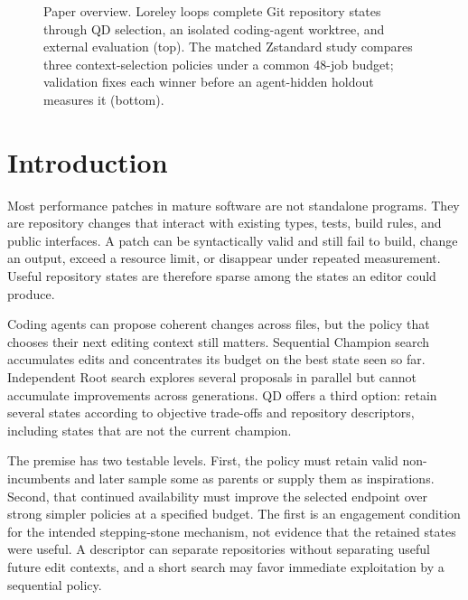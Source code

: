 \documentclass[10pt,twocolumn]{article}
\begin{document}
\begin{figure}[t]
  \caption{Paper overview. Loreley loops complete Git repository states through
  QD selection, an isolated coding-agent worktree, and external evaluation
  (top). The matched Zstandard study compares three context-selection policies
  under a common 48-job budget; validation fixes each winner before an
  agent-hidden holdout measures it (bottom).}
  \label{fig:overview}
\end{figure}

\section{Introduction}

Most performance patches in mature software are not standalone programs. They
are repository changes that interact with existing types, tests, build rules,
and public interfaces. A patch can be syntactically valid and still fail to
build, change an output, exceed a resource limit, or disappear under repeated
measurement. Useful repository states are therefore sparse among the states an
editor could produce.

Coding agents can propose coherent changes across files, but the policy that
chooses their next editing context still matters. Sequential Champion search
accumulates edits and concentrates its budget on the best state seen so far.
Independent Root search explores several proposals in parallel but cannot
accumulate improvements across generations. QD offers a third option: retain
several states according to objective trade-offs and repository descriptors,
including states that are not the current champion.

The premise has two testable levels. First, the policy must retain valid
non-incumbents and later sample some as parents or supply them as inspirations.
Second, that continued availability must improve the selected endpoint over
strong simpler policies at a specified budget. The first is an engagement
condition for the intended stepping-stone mechanism, not evidence that the
retained states were useful. A descriptor can separate repositories without
separating useful future edit contexts, and a short search may favor immediate
exploitation by a sequential policy.
\end{document}
